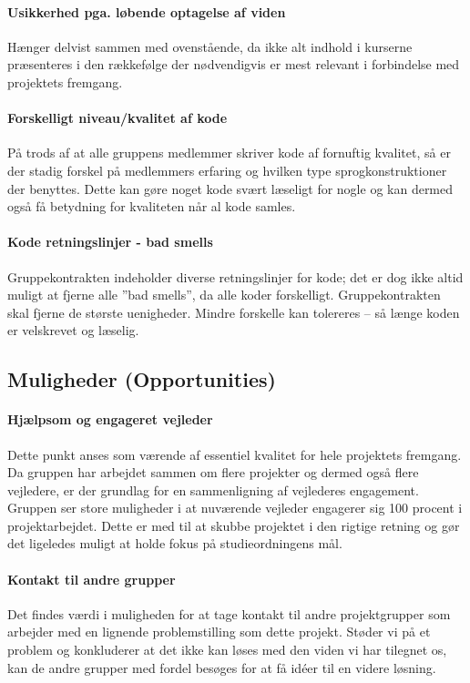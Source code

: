 \paragraph{Usikkerhed pga. løbende optagelse af viden}\label{swot:optagelse_af_viden}
Hænger delvist sammen med ovenstående, da ikke alt indhold i kurserne præsenteres i den rækkefølge der nødvendigvis er mest relevant i forbindelse med projektets fremgang.

\paragraph{Forskelligt niveau/kvalitet af kode}\label{swot:niveau_af_kode}
På trods af at alle gruppens medlemmer skriver kode af fornuftig kvalitet, så er der stadig forskel på medlemmers erfaring og hvilken type sprogkonstruktioner der benyttes.
Dette kan gøre noget kode svært læseligt for nogle og kan dermed også få betydning for kvaliteten når al kode samles.

\paragraph{Kode retningslinjer - bad smells}\label{swot:bad_smells}
Gruppekontrakten indeholder diverse retningslinjer for kode; det er dog ikke altid muligt at fjerne alle ''bad smells'', da alle koder forskelligt.
Gruppekontrakten skal fjerne de største uenigheder.
Mindre forskelle kan tolereres -- så længe koden er velskrevet og læselig.

\subsection{Muligheder \textnormal{(\textbf{O}pportunities)}}

\paragraph{Hjælpsom og engageret vejleder}
Dette punkt anses som værende af essentiel kvalitet for hele projektets fremgang. 
Da gruppen har arbejdet sammen om flere projekter og dermed også flere vejledere, er der grundlag for en sammenligning af vejlederes engagement.
Gruppen ser store muligheder i at nuværende vejleder engagerer sig 100 procent i projektarbejdet.
Dette er med til at skubbe projektet i den rigtige retning og gør det ligeledes muligt at holde fokus på studieordningens mål.

\paragraph{Kontakt til andre grupper}
Det findes værdi i muligheden for at tage kontakt til andre projektgrupper som arbejder med en lignende problemstilling som dette projekt.
Støder vi på et problem og konkluderer at det ikke kan løses med den viden vi har tilegnet os, kan de andre grupper med fordel besøges for at få idéer til en videre løsning.

